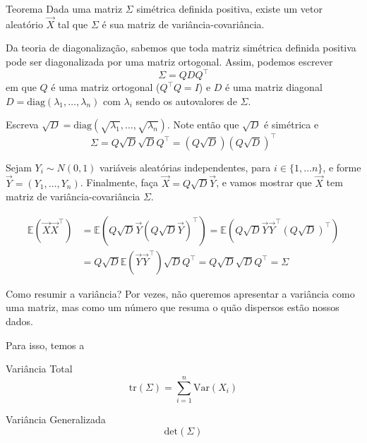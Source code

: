 \documentclass[
  ignorenonframetext,
  aspectratio=169,
]{beamer}
\newcommand{\EE}{\mathbb{E}}
\newcommand{\vX}{\vec{X}}
\newcommand{\vY}{\vec{Y}}
\begin{document}
\begin{frame}
\begin{block}{Teorema}
 Dada uma matriz $\Sigma$ simétrica definida positiva, existe um vetor aleatório $\vX$ tal que $\Sigma$ é sua matriz de variância-covariância.
\end{block}

\pause 

Da teoria de diagonalização, sabemos que toda matriz simétrica definida positiva pode ser diagonalizada por uma matriz ortogonal. Assim, podemos escrever
\[\Sigma = QDQ^\top\]
em que $Q$ é uma matriz ortogonal ($Q^\top Q = I$) e $D$ é uma matriz diagonal $D = \text{diag}(\lambda_1,\ldots,\lambda_n)$
com $\lambda_i$ sendo os autovalores de $\Sigma$.
\end{frame}

\begin{frame}
  Escreva $\sqrt{D} = \text{diag}(\sqrt{\lambda_1},\ldots,\sqrt{\lambda_n})$. Note então que $\sqrt{D}$ é simétrica e 
  $$\Sigma = Q\sqrt{D}\sqrt{D}Q^\top = (Q\sqrt{D}) (Q\sqrt{D})^\top$$

  Sejam $Y_i \sim N(0,1)$ variáveis aleatórias independentes, para $i\in\{1,\ldots n\}$, e forme $\vY = (Y_1,\ldots,Y_n)$. 
  Finalmente, faça $\vX = Q\sqrt{D}\vY$, e vamos mostrar que $\vX$ tem matriz de variância-covariância $\Sigma$.
\end{frame}

\begin{frame}
  \begin{align*}
    \EE(\vX\vX^\top) &= \EE(Q\sqrt{D}\vY (Q\sqrt{D}\vY)^\top) = \EE(Q\sqrt{D} \vY\vY^\top (Q\sqrt{D})^\top) \\
    &= Q\sqrt{D}\EE(\vY \vY^\top)\sqrt{D}Q^\top = Q\sqrt{D}\sqrt{D}Q^\top = \Sigma
  \end{align*}
\end{frame}

\begin{frame}{Como resumir a variância?}
Por vezes, não queremos apresentar a variância como uma matriz, mas como
um número que resuma o quão dispersos estão nossos dados.

Para isso, temos a

\begin{block}{Variância Total} %
\[\text{tr}(\Sigma) = \sum_{i=1}^n \text{Var}(X_i) \]
\end{block}

\begin{block}{Variância Generalizada} %
\[\text{det}(\Sigma)\]
\end{block}
\end{frame}
\end{document}
